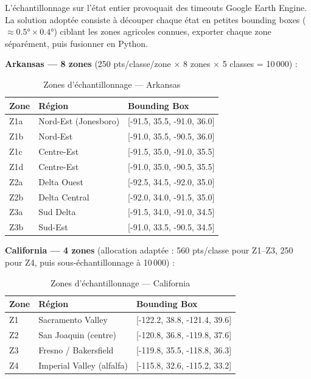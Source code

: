 L'échantillonnage sur l'état entier provoquait des timeouts Google Earth
Engine. La solution adoptée consiste à découper chaque état en petites
bounding boxes ($\approx 0.5° \times 0.4°$) ciblant les zones agricoles
connues, exporter chaque zone séparément, puis fusionner en Python.

\textbf{Arkansas — 8 zones} (250 pts/classe/zone $\times$ 8 zones $\times$ 5 classes = 10\,000) :

\begin{table}[H]
\centering
\caption{Zones d'échantillonnage — Arkansas}
\label{tab:zones_ark}
\begin{tabular}{lll}
\toprule
\textbf{Zone} & \textbf{Région} & \textbf{Bounding Box} \\
\midrule
Z1a & Nord-Est (Jonesboro)   & [-91.5, 35.5, -91.0, 36.0] \\
Z1b & Nord-Est               & [-91.0, 35.5, -90.5, 36.0] \\
Z1c & Centre-Est             & [-91.5, 35.0, -91.0, 35.5] \\
Z1d & Centre-Est             & [-91.0, 35.0, -90.5, 35.5] \\
Z2a & Delta Ouest            & [-92.5, 34.5, -92.0, 35.0] \\
Z2b & Delta Central          & [-92.0, 34.0, -91.5, 35.0] \\
Z3a & Sud Delta              & [-91.5, 34.0, -91.0, 34.5] \\
Z3b & Sud-Est                & [-91.0, 33.5, -90.5, 34.5] \\
\bottomrule
\end{tabular}
\end{table}

\textbf{California — 4 zones} (allocation adaptée : 560 pts/classe pour Z1--Z3, 250 pour Z4, puis sous-échantillonnage à 10\,000) :

\begin{table}[H]
\centering
\caption{Zones d'échantillonnage — California}
\label{tab:zones_cal}
\begin{tabular}{lll}
\toprule
\textbf{Zone} & \textbf{Région} & \textbf{Bounding Box} \\
\midrule
Z1 & Sacramento Valley              & [-122.2, 38.8, -121.4, 39.6] \\
Z2 & San Joaquin (centre)           & [-120.8, 36.8, -119.8, 37.6] \\
Z3 & Fresno / Bakersfield           & [-119.8, 35.5, -118.8, 36.3] \\
Z4 & Imperial Valley (alfalfa)      & [-115.8, 32.6, -115.2, 33.2] \\
\bottomrule
\end{tabular}
\end{table}

